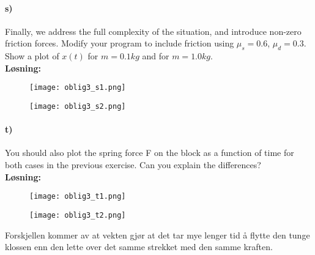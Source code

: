 \documentclass[11pt, A4paper,norsk]{article}
\begin{document}
		\paragraph{s)}
			\begin{flushleft}
Finally, we address the full complexity of the situation, and introduce non-zero friction forces.
Modify your program to include friction using $\mu_s = 0.6$, $\mu_d = 0.3$. Show a plot of $x(t)$ for $m = 0.1kg$ and for $m = 1.0kg$. \\
\vspace{1mm}
\textbf{Løsning:} \\
\vspace{1mm}

				\begin{figure}[H]
\texttt{[image: oblig3\_s1.png]}
				\end{figure}
				\begin{figure}[H]
\texttt{[image: oblig3\_s2.png]}
				\end{figure}
			\end{flushleft}










		\paragraph{t)}
		\begin{flushleft}
You should also plot the spring force F on the block as a function of time for both cases in the previous exercise. Can you explain the differences? \\
\vspace{1mm}
\textbf{Løsning:} \\
\vspace{1mm}

			\begin{figure}[H]
\texttt{[image: oblig3\_t1.png]}
			\end{figure}
			\begin{figure}[H]
\texttt{[image: oblig3\_t2.png]}
			\end{figure}
Forskjellen kommer av at vekten gjør at det tar mye lenger tid å flytte den tunge klossen enn den lette over det samme strekket med den samme kraften.
		\end{flushleft}
\end{document}
